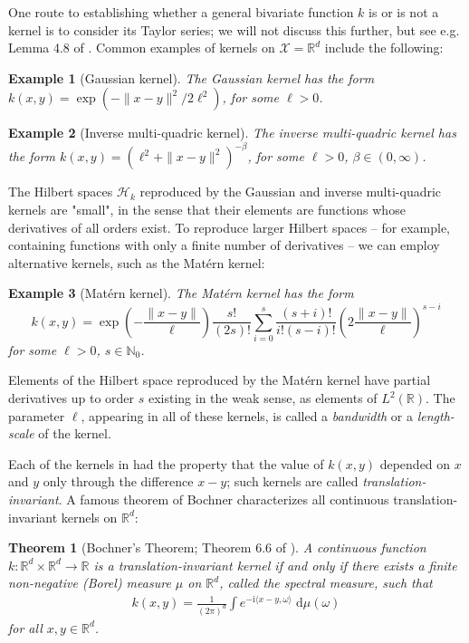 \documentclass[12pt,paper=letter]{scrreprt}
\newtheorem{theorem}{Theorem}[chapter]
\newtheorem{example}{Example}[chapter]
\begin{document}
One route to establishing whether a general bivariate function $k$ is or is not a kernel is to consider its Taylor series; we will not discuss this further, but see e.g. Lemma 4.8 of \citet{steinwart2008support}.
Common examples of kernels on $\mathcal{X} = \mathbb{R}^d$ include the following:

\begin{example}[Gaussian kernel] \label{ex: Gauss kernel}
The \emph{Gaussian} kernel has the form
$k(x,y) = \exp(- \|x - y\|^2 / 2 \ell^2)$, for some $\ell > 0$.
\end{example}

\begin{example}[Inverse multi-quadric kernel] \label{ex: IMQ kernel}
The \emph{inverse multi-quadric} kernel has the form
$k(x,y) = (\ell^2 + \|x - y\|^2)^{-\beta}$, for some $\ell > 0$, $\beta \in (0,\infty)$.
\end{example}

The Hilbert spaces $\mathcal{H}_k$ reproduced by the Gaussian and inverse multi-quadric kernels are "small", in the sense that their elements are functions whose derivatives of all orders exist.
To reproduce larger Hilbert spaces -- for example, containing functions with only a finite number of derivatives -- we can employ alternative kernels, such as the Mat\'{e}rn kernel:

\begin{example}[Mat\'{e}rn kernel] \label{ex: Matern kernel}
The Mat\'{e}rn kernel has the form
$$
k(x,y) = \exp\left( - \frac{\|x-y\|}{\ell} \right) \frac{s!}{(2s)!} \sum_{i=0}^s \frac{(s+i)!}{i! (s-i)!} \left( 2 \frac{\|x-y\|}{\ell} \right)^{s-i} 
$$
for some $\ell > 0$, $s \in \mathbb{N}_0$.
\end{example}

\noindent Elements of the Hilbert space reproduced by the Mat\'{e}rn kernel have partial derivatives up to order $s$ existing in the weak sense, as elements of $L^2(\mathbb{R})$.
The parameter $\ell$, appearing in all of these kernels, is called a \emph{bandwidth} or a \emph{length-scale} of the kernel.

Each of the kernels in  had the property that the value of $k(x,y)$ depended on $x$ and $y$ only through the difference $x - y$; such kernels are called \emph{translation-invariant}.
A famous theorem of Bochner characterizes all continuous translation-invariant kernels on $\mathbb{R}^d$:

\begin{theorem}[Bochner's Theorem; Theorem 6.6 of \citealp{wendland2004scattered}]
\label{thm: bochner}
    A continuous function $k : \mathbb{R}^d \times \mathbb{R}^d \rightarrow \mathbb{R}$ is a translation-invariant kernel if and only if there exists a finite non-negative (Borel) measure $\mu$ on $\mathbb{R}^d$, called the \emph{spectral measure}, such that
    \begin{align}
        k(x,y) = \frac{1}{(2 \pi)^d} \int e^{-\mathrm{i}\langle x-y , \omega \rangle} \; \mathrm{d}\mu(\omega) \label{eq: Bochner thm}
    \end{align}
    for all $x,y \in \mathbb{R}^d$.
\end{theorem}
\end{document}

